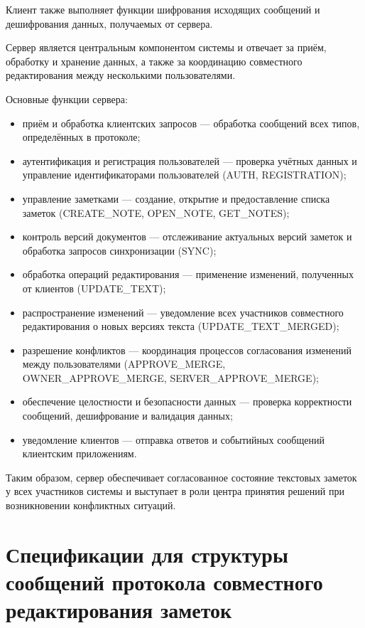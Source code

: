 Клиент также выполняет функции шифрования исходящих сообщений и дешифрования данных, получаемых от сервера.

Сервер является центральным компонентом системы и отвечает за приём, обработку и хранение данных, а также за координацию совместного редактирования между несколькими пользователями.

Основные функции сервера:

\begin{itemize}
    \item приём и обработка клиентских запросов — обработка сообщений всех типов, определённых в протоколе;
    \item аутентификация и регистрация пользователей — проверка учётных данных и управление идентификаторами пользователей (AUTH, REGISTRATION);
    \item управление заметками — создание, открытие и предоставление списка заметок (CREATE\_NOTE, OPEN\_NOTE, GET\_NOTES);
    \item контроль версий документов — отслеживание актуальных версий заметок и обработка запросов синхронизации (SYNC);
    \item обработка операций редактирования — применение изменений, полученных от клиентов (UPDATE\_TEXT);
    \item распространение изменений — уведомление всех участников совместного редактирования о новых версиях текста (UPDATE\_TEXT\_MERGED);
    \item разрешение конфликтов — координация процессов согласования изменений между пользователями (APPROVE\_MERGE, OWNER\_APPROVE\_MERGE, SERVER\_APPROVE\_MERGE);
    \item обеспечение целостности и безопасности данных — проверка корректности сообщений, дешифрование и валидация данных;
    \item уведомление клиентов — отправка ответов и событийных сообщений клиентским приложениям.
\end{itemize}

Таким образом, сервер обеспечивает согласованное состояние текстовых заметок у всех участников системы и выступает в роли центра принятия решений при возникновении конфликтных ситуаций.


\section{Спецификации для структуры сообщений протокола совместного редактирования заметок}

